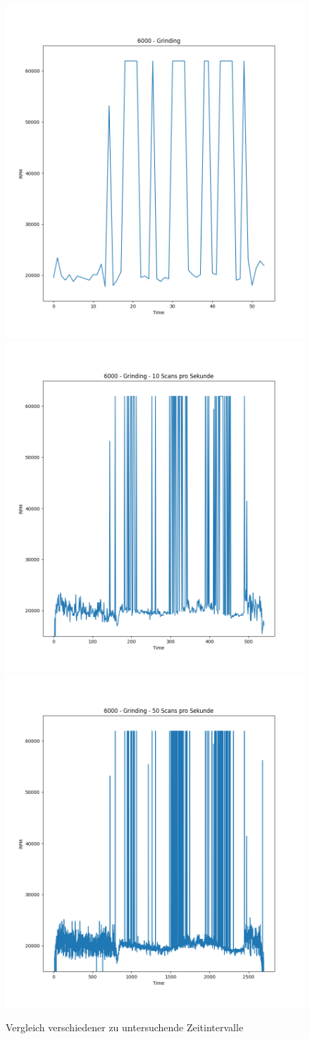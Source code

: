 \begin{figure}[H]
    \includegraphics[width=0.5\linewidth]{Studienarbeit//images/cwt-6000-grinding-freqs-1.png} 
    \includegraphics[width=0.5\linewidth]{Studienarbeit//images/cwt-6000-grinding-freqs-10.png}   
    \includegraphics[width=0.5\linewidth]{Studienarbeit//images/cwt-6000-grinding-freqs-50.png}   
    \caption{Vergleich verschiedener zu untersuchende Zeitintervalle}
    \label{fig:cwt-iso-freqs-genauigkeit}
\end{figure}



